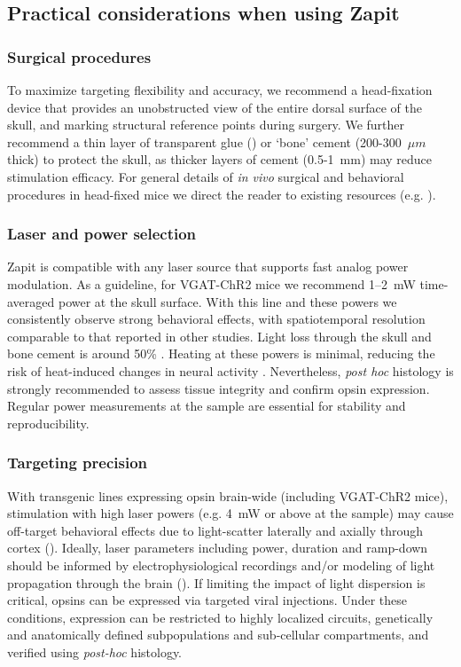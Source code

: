 \subsection{Practical considerations when using Zapit}
\subsubsection{Surgical procedures} 
To maximize targeting flexibility and accuracy, we recommend a head-fixation device that provides an unobstructed view of the entire dorsal surface of the skull, and marking structural reference points during surgery.
We further recommend a thin layer of transparent glue (\cite{Zatka-Haas2021SensoryDecision, Coen2023MouseDecisions}) or `bone' cement (200-300~$\mu m$ thick) to protect the skull, as thicker layers of cement (0.5-1~mm) may reduce stimulation efficacy.
For general details of \textit{in vivo} surgical and behavioral procedures in head-fixed mice we direct the reader to existing resources (e.g. \cite{Guo2014FlowMice, Guo2014ProceduresMice} ). 

\subsubsection{Laser and power selection}
Zapit is compatible with any laser source that supports fast analog power modulation. 
As a guideline, for VGAT-ChR2 mice we recommend 1--2~mW time-averaged power at the skull surface. 
With this line and these powers we consistently observe strong behavioral effects, with spatiotemporal resolution comparable to that reported in other studies. 
Light loss through the skull and bone cement is around 50\% \citep{Guo2014FlowMice}. 
Heating at these powers is minimal, reducing the risk of heat-induced changes in neural activity \citep{Stujenske2015ModelingOptogenetics}. 
Nevertheless, \textit{post hoc} histology is strongly recommended to assess tissue integrity and confirm opsin expression. 
Regular power measurements at the sample are essential for stability and reproducibility.


\subsubsection{Targeting precision}
With transgenic lines expressing opsin brain-wide (including VGAT-ChR2 mice), stimulation with high laser powers (e.g. 4~mW or above at the sample) may cause off-target behavioral effects due to light-scatter laterally and axially through cortex (\cite{Li2019SpatiotemporalCircuits,Babl2019TheInterneurons}).
Ideally, laser parameters including power, duration and ramp-down should be informed by electrophysiological recordings and/or modeling of light propagation through the brain (\cite{Yona2016RealisticApplications}).
If limiting the impact of light dispersion is critical, opsins can be expressed via targeted viral injections.
Under these conditions, expression can be restricted to highly localized circuits, genetically and anatomically defined subpopulations and sub-cellular compartments, and verified using \textit{post-hoc} histology.

